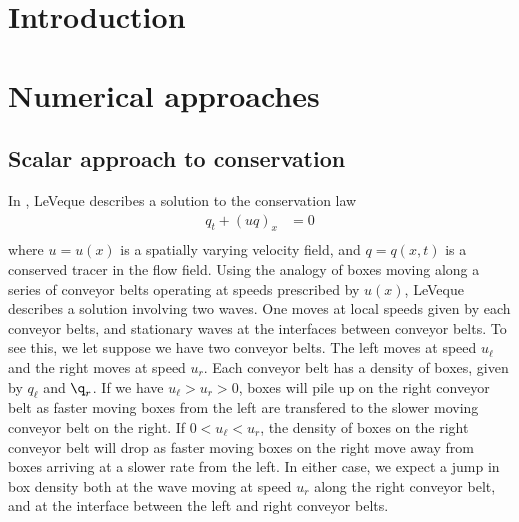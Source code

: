 \documentclass{article}
\begin{document}
\section{Introduction}
\section{Numerical approaches}

\subsection{Scalar approach to conservation}
In \cite{le:2002}, LeVeque describes a solution to the conservation law
\begin{align}
q_t + (uq)_x &= 0 \\
\end{align}
where $u = u(x)$ is a spatially varying velocity field, and $q = q(x,t)$ is a conserved  tracer in  the flow field.  Using the analogy of boxes moving along a series of conveyor belts operating
at speeds prescribed by $u(x)$, LeVeque describes a solution involving two waves. One moves at local speeds given by each conveyor belts, and stationary waves at the interfaces between conveyor belts.  To see this, we let suppose we have two conveyor belts. The left moves at speed $u_\ell$ and the right moves at speed $u_r$.  Each conveyor belt has a density of boxes, given by $q_\ell$ and $\q_r$. 
If we have $u_\ell > u_r > 0$, boxes will pile up on the right conveyor belt  as faster moving boxes from the left are transfered to the slower moving conveyor belt on the right.  If $0 < u_\ell < u_r$, the density of boxes on the right conveyor belt will drop as faster moving boxes on the right move away from boxes arriving at a slower rate from the left.  In either case, we expect a jump 
in box density both at the wave moving at speed $u_r$ along the right conveyor belt, and at the interface between the left and right conveyor belts.
\end{document}
